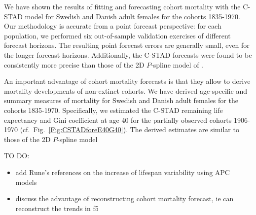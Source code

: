 \documentclass[11pt, a4paper]{article}
\begin{document}
We have shown the results of fitting and forecasting cohort mortality with the C-STAD model for Swedish and Danish adult females for the cohorts 1835-1970. Our methodology is accurate from a point forecast perspective: for each population, we performed six out-of-sample validation exercises of different forecast horizons. The resulting point forecast errors are generally small, even for the longer forecast horizons. Additionally, the C-STAD forecasts were found to be consistently more precise than those of the 2D $P$-spline model of \cite{currie2004smoothing}.

An important advantage of cohort mortality forecasts is that they allow to derive mortality developments of non-extinct cohorts. We have derived age-specific and summary measures of mortality for Swedish and Danish adult females for the cohorts 1835-1970. Specifically, we estimated the C-STAD remaining life expectancy and Gini coefficient at age 40 for the partially observed cohorts 1906-1970 (cf.~Fig.~\ref{Fig:CSTADforeE40G40}). The derived estimates are similar to those of the 2D $P$-spline model

\bigskip

\noindent 
TO DO:
\begin{itemize}
	\item add Rune's references on the increase of lifespan variability using APC models
	\item discuss the advantage of reconstructing cohort mortality forecast, ie can reconstruct the trends in f5
\end{itemize}
\end{document}
